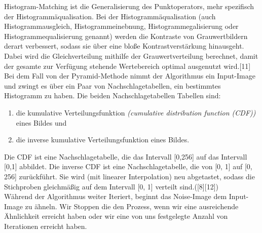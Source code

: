 \documentclass[12pt]{report}
\begin{document}
Histogram-Matching ist die Generalisierung des Punktoperators, mehr spezifisch der Histogrammäqualisation.
Bei der Histogrammäqualisation {(auch Histogrammausgleich, Histogrammeinebnung, Histogrammegalisierung oder Histogrammequalisierung genannt)}
werden die Kontraste von Grauwertbildern derart verbessert, sodass sie über eine bloße Kontrastverstärkung hinausgeht.
Dabei wird die Gleichverteilung mithilfe der Grauwertverteilung berechnet, damit der gesamte zur Verfügung stehende Wertebereich optimal ausgenutzt wird.{[11]}
Bei dem Fall von der Pyramid-Methode nimmt der Algorithmus ein Input-Image und zwingt es über ein Paar von Nachschlagetabellen, ein bestimmtes Histogramm zu haben.
Die beiden Nachschlagetabellen Tabellen sind:

\begin{enumerate}
    \item die kumulative Verteilungsfunktion \textit{(cumulative distribution function (CDF))} eines Bildes und
    \item die inverse kumulative Verteilungsfunktion eines Bildes.
  \end{enumerate}

Die CDF ist eine Nachschlagetabelle, die das Intervall {[0,256]} auf das Intervall {[0,1]} abbildet.
Die inverse CDF ist eine Nachschlagetabelle, die von {[0, 1]} auf {[0, 256]} zurückführt.
Sie wird {(mit linearer Interpolation)} neu abgetastet,
sodass die Stichproben gleichmäßig auf dem Intervall {[0, 1]} verteilt sind.{([8][12])}\\
Während der Algorithmus weiter Iteriert, beginnt das Noise-Image dem Input-Image zu ähneln.
Wir Stoppen die den Prozess, wenn wir eine ausreichende Ähnlichkeit erreicht haben oder wir eine von uns festgelegte Anzahl von Iterationen erreicht haben.
\end{document}
